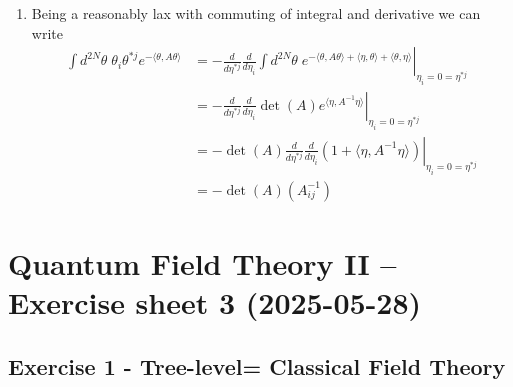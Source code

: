 \documentclass[10pt,a4paper]{article}
\theoremstyle{definition}
\begin{document}
\begin{enumerate}
\item Being a reasonably lax with commuting of integral and derivative we can write
\begin{align}
\int d^{2N}\theta \; \theta_i\theta^{*j}e^{-\langle\theta,A\theta\rangle}
&=-\left.\frac{d}{d\eta^{*j}}\frac{d}{d\eta_i}\int d^{2N}\theta \; e^{-\langle\theta,A\theta\rangle+\langle\eta,\theta\rangle+\langle\theta,\eta\rangle}\right|_{\eta_i=0=\eta^{*j}}\\
&=-\left.\frac{d}{d\eta^{*j}}\frac{d}{d\eta_i}\det(A)e^{\langle\eta,A^{-1}\eta\rangle}\right|_{\eta_i=0=\eta^{*j}}\\
&=-\det(A)\left.\frac{d}{d\eta^{*j}}\frac{d}{d\eta_i}(1+\langle\eta,A^{-1}\eta\rangle)\right|_{\eta_i=0=\eta^{*j}}\\
&=-\det(A)(A^{-1}_{ij})
\end{align}

\end{enumerate}

\newpage
\section{Quantum Field Theory II – Exercise sheet 3 (2025-05-28)}
\subsection{Exercise 1 - Tree-level= Classical Field Theory}
\end{document}
